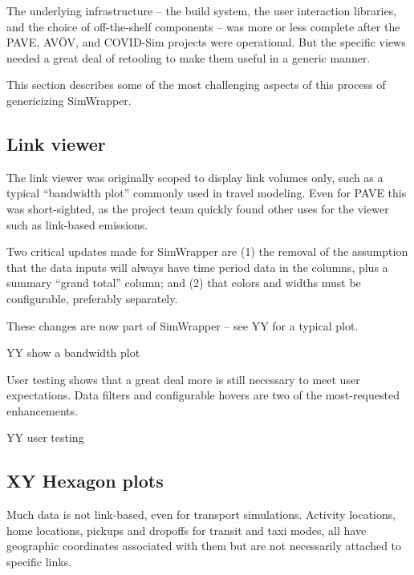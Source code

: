 The underlying infrastructure -- the build system, the user interaction
libraries, and the choice of off-the-shelf components -- was more or
less complete after the PAVE, AVÖV, and COVID-Sim projects were
operational. But the specific views needed a great deal of retooling to
make them useful in a generic manner.

This section describes some of the most challenging aspects of this
process of genericizing SimWrapper.


\hypertarget{link-viewer}{%
\subsection{Link viewer}\label{link-viewer}}

The link viewer was originally scoped to display link volumes only, such
as a typical ``bandwidth plot'' commonly used in travel modeling. Even
for PAVE this was short-sighted, as the project team quickly found other
uses for the viewer such as link-based emissions.

Two critical updates made for SimWrapper are (1) the removal of the
assumption that the data inputs will always have time period data in the
columns, plus a summary ``grand total'' column; and (2) that colors and
widths must be configurable, preferably separately.

These changes are now part of SimWrapper -- see YY for a typical plot.

YY show a bandwidth plot

User testing shows that a great deal more is still necessary to meet
user expectations. Data filters and configurable hovers are two of the
most-requested enhancements.

YY user testing


\hypertarget{xy-hexagon-plots}{%
\subsection{XY Hexagon plots}\label{xy-hexagon-plots}}

Much data is not link-based, even for transport simulations. Activity locations, home locations, pickups and dropoffs for transit and taxi modes, all have geographic coordinates associated with them but are not necessarily attached to specific links.

